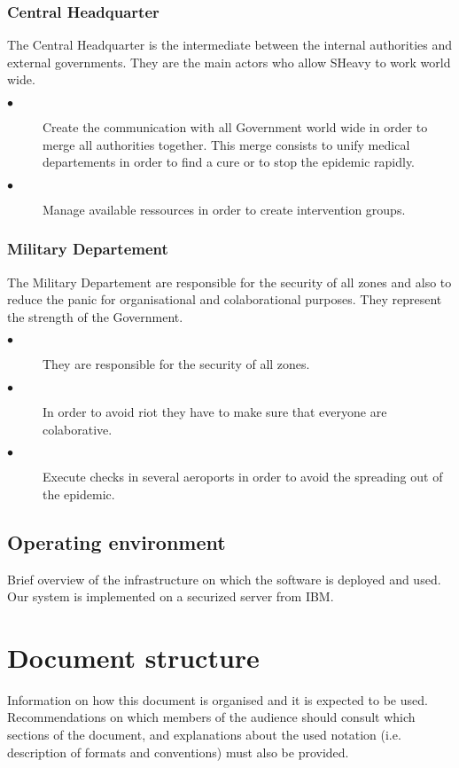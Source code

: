 \subsubsection{Central Headquarter}
The Central Headquarter is the intermediate between the internal authorities and
external governments. They are the main actors who allow SHeavy to work world
wide.\\
\begin{description} 
 \item[$\bullet$] Create the communication with all Government world wide in
 order to merge all authorities together. This merge consists to unify medical
 departements in order to find a cure or to stop the epidemic rapidly.\\
 \item[$\bullet$] Manage available ressources in order to create intervention
 groups.\\ 
\end{description} 

\subsubsection{Military Departement}
The Military Departement are responsible for the security of all zones and also
to reduce the panic for organisational and colaborational purposes. They
represent the strength of the Government.
\begin{description} 
 \item[$\bullet$]They are responsible for the security of all zones.
 \item[$\bullet$]In order to avoid riot they have to make sure that everyone are
 colaborative. 
 \item[$\bullet$]Execute checks in several aeroports in order to avoid the
 spreading out of the epidemic.
\end{description}  

\subsection{Operating environment}
Brief overview of the infrastructure on which the software is deployed and used.
Our system is implemented on a securized server from IBM.

\section{Document structure}  
Information on how this document is organised and it is expected to be
used. Recommendations on which members of the audience
should consult which sections of the document, and explanations about the used
notation (i.e. description of formats and conventions) must also be provided.







